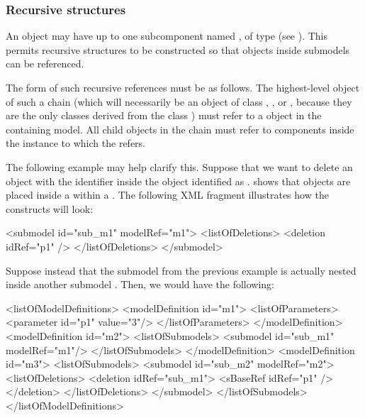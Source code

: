 \subsubsection{Recursive  structures}
\label{sbaseref-recursive-sbaseref}

An \SBaseRef object may have up to one subcomponent named
, of type \SBaseRef (see ).  This
permits recursive structures to be constructed so that
objects inside submodels can be referenced.

The form of such recursive references must be as follows.  The
highest-level \SBaseRef object of such a chain (which will necessarily
be an object of class \Port, \Deletion, \ReplacedElement or \ReplacedBy,
because they are the only classes derived from the class \SBaseRef) must
refer to a \Submodel object in the containing model.  All child
\SBaseRef objects in the chain must refer to components inside the
\Model instance to which the \Submodel refers.

The following example may help clarify this.  Suppose that we want to
delete an object with the identifier  inside the \Submodel
object identified as .   shows that \Deletion
objects are placed inside a \ListOfDeletions within a \Submodel.  The 
following XML fragment illustrates how the constructs will look:

\begin{example}
<submodel id="sub_m1" modelRef="m1">
  <listOfDeletions>
    <deletion idRef="p1" />
  </listOfDeletions>
</submodel>
\end{example}

Suppose instead that the submodel  from the previous example is
actually nested inside another submodel .  Then, we would have
the following:

\begin{example}
<listOfModelDefinitions>
  <modelDefinition id="m1">
    <listOfParameters>
      <parameter id="p1" value="3"/>
    </listOfParameters>
  </modelDefinition>
  <modelDefinition id="m2">
    <listOfSubmodels>
      <submodel id="sub_m1" modelRef="m1"/>
    </listOfSubmodels>    
  </modelDefinition>
  <modelDefinition id="m3">
    <listOfSubmodels>
      <submodel id="sub_m2" modelRef="m2">
        <listOfDeletions>
          <deletion idRef="sub_m1">
            <sBaseRef idRef="p1" />
          </deletion>
        </listOfDeletions>
      </submodel>
    </listOfSubmodels>    
</listOfModelDefinitions>
\end{example}

